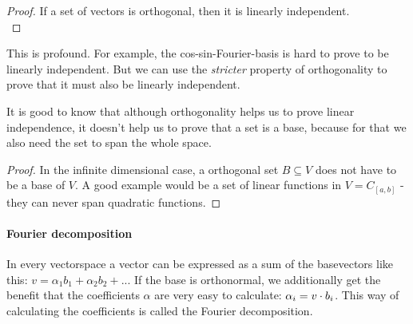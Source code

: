 \begin{proof} If a set of vectors is orthogonal, then it is linearly independent. \\
\end{proof}
This is profound. For example, the cos-sin-Fourier-basis is hard to prove to be linearly independent. But we can use the \emph{stricter} property of orthogonality to prove that it must also be linearly independent. 

It is good to know that although orthogonality helps us to prove linear independence, it doesn't help us to prove that a set is a base, because for that we also need the set to span the whole space. 
\begin{proof} In the infinite dimensional case, a orthogonal set $B \subseteq V$ does not have to be a base of $V$. A good example would be a set of linear functions in $V = C_{[a,b]}$ - they can never span quadratic functions. 
\end{proof}

\paragraph{Fourier decomposition} \label{fourierDecomposition}
In every vectorspace a vector can be expressed as a sum of the basevectors like this: $v = \alpha_1 b_1 + \alpha_2 b_2 + ...$ If the base is orthonormal, we additionally get the benefit that the coefficients $\alpha$ are very easy to calculate: $\alpha_i = v \cdot b_i$. This way of calculating the coefficients is called the Fourier decomposition. 

